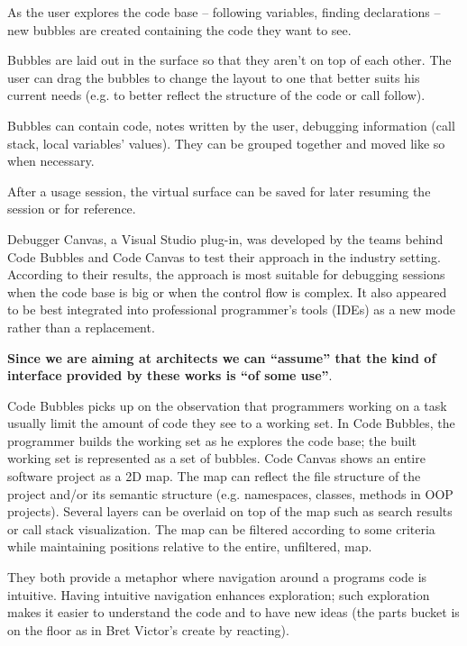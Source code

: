 \documentclass{./llncs2e/llncs}
\begin{document}
	As the user explores the code base -- following variables, finding declarations -- new bubbles are created containing the code they want to see.

	Bubbles are laid out in the surface so that they aren't on top of each other. The user can drag the bubbles to change the layout to one that better suits his current needs (e.g. to better reflect the structure of the code or call follow).

	Bubbles can contain code, notes written by the user, debugging information (call stack, local variables' values). They can be grouped together and moved like so when necessary.

	After a usage session, the virtual surface can be saved for later resuming the session or for reference.

	Debugger Canvas, a Visual Studio plug-in, was developed by the teams behind Code Bubbles and Code Canvas to test their approach in the industry setting. According to their results, the approach is most suitable for debugging sessions when the code base is big or when the control flow is complex. It also appeared to be best integrated into professional programmer's tools (IDEs) as a new mode rather than a replacement.

	\textbf{Since we are aiming at architects we can ``assume'' that the kind of interface provided by these works is ``of some use''}.

	Code Bubbles picks up on the observation that programmers working on a task usually limit the amount of code they see to a working set. In Code Bubbles, the programmer builds the working set as he explores the code base; the built working set is represented as a set of bubbles.
	Code Canvas shows an entire software project as a 2D map. The map can reflect the file structure of the project and/or its semantic structure (e.g. namespaces, classes, methods in OOP projects). Several layers can be overlaid on top of the map such as search results or call stack visualization. The map can be filtered according to some criteria while maintaining positions relative to the entire, unfiltered, map.

	They both provide a metaphor where navigation around a programs code is intuitive. Having intuitive navigation enhances exploration; such exploration makes it easier to understand the code and to have new ideas (the parts bucket is on the floor as in Bret Victor's create by reacting).
\end{document}
